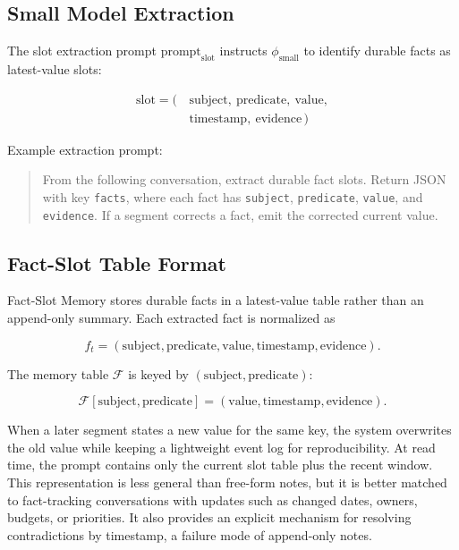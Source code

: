 \documentclass[conference]{IEEEtran}
\begin{document}
\subsection{Small Model Extraction}

The slot extraction prompt $\text{prompt}_{\text{slot}}$ instructs $\phi_{\text{small}}$ to identify durable facts as latest-value slots:

\begin{equation}
\begin{split}
\text{slot} = (\,&\text{subject},\ \text{predicate},\ \text{value},\\
&\text{timestamp},\ \text{evidence}\,)
\end{split}
\end{equation}

Example extraction prompt:
\begin{quote}
From the following conversation, extract durable fact slots. Return JSON with key \texttt{facts}, where each fact has \texttt{subject}, \texttt{predicate}, \texttt{value}, and \texttt{evidence}. If a segment corrects a fact, emit the corrected current value.
\end{quote}

\subsection{Fact-Slot Table Format}
\label{sec:slot-format}

Fact-Slot Memory stores durable facts in a latest-value table rather than an append-only summary. Each extracted fact is normalized as

\begin{equation}
f_t = (\text{subject}, \text{predicate}, \text{value}, \text{timestamp}, \text{evidence}).
\end{equation}

The memory table $\mathcal{F}$ is keyed by $(\text{subject}, \text{predicate})$:

\begin{equation}
\mathcal{F}[\text{subject}, \text{predicate}] = (\text{value}, \text{timestamp}, \text{evidence}).
\end{equation}

When a later segment states a new value for the same key, the system overwrites the old value while keeping a lightweight event log for reproducibility. At read time, the prompt contains only the current slot table plus the recent window. This representation is less general than free-form notes, but it is better matched to fact-tracking conversations with updates such as changed dates, owners, budgets, or priorities. It also provides an explicit mechanism for resolving contradictions by timestamp, a failure mode of append-only notes.
\end{document}

